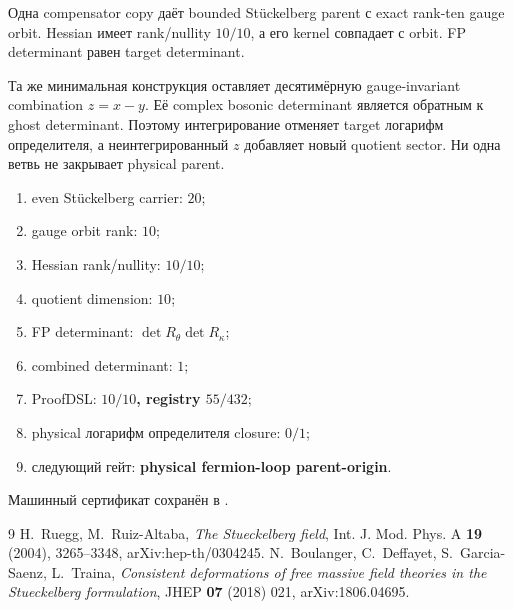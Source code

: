 \begin{theorem}
Одна compensator copy даёт bounded Stückelberg parent с exact
rank-ten gauge orbit. Hessian имеет rank/nullity $10/10$, а его kernel
совпадает с orbit. FP determinant равен target determinant.
\end{theorem}

\begin{nogocriterion}
Та же минимальная конструкция оставляет десятимёрную gauge-invariant
combination $z=x-y$. Её complex bosonic determinant является обратным к
ghost determinant. Поэтому интегрирование отменяет target логарифм определителя, а
неинтегрированный $z$ добавляет новый quotient sector. Ни одна ветвь не
закрывает physical parent.
\end{nogocriterion}

\begin{protocol}\begin{enumerate}
\item even Stückelberg carrier: \textbf{$20$};
\item gauge orbit rank: \textbf{$10$};
\item Hessian rank/nullity: \textbf{$10/10$};
\item quotient dimension: \textbf{$10$};
\item FP determinant: \textbf{$\det R_\theta\det R_\kappa$};
\item combined determinant: \textbf{$1$};
\item ProofDSL: \textbf{$10/10$, registry $55/432$};
\item physical логарифм определителя closure: \textbf{$0/1$};
\item следующий гейт: \textbf{physical fermion-loop parent-origin}.
\end{enumerate}\end{protocol}

Машинный сертификат сохранён в
.

\begin{thebibliography}{9}
H.~Ruegg, M.~Ruiz-Altaba,
\emph{The Stueckelberg field},
Int. J. Mod. Phys. A \textbf{19} (2004), 3265--3348,
arXiv:hep-th/0304245.
N.~Boulanger, C.~Deffayet, S.~Garcia-Saenz, L.~Traina,
\emph{Consistent deformations of free massive field theories in the
Stueckelberg formulation},
JHEP \textbf{07} (2018) 021, arXiv:1806.04695.
\end{thebibliography}